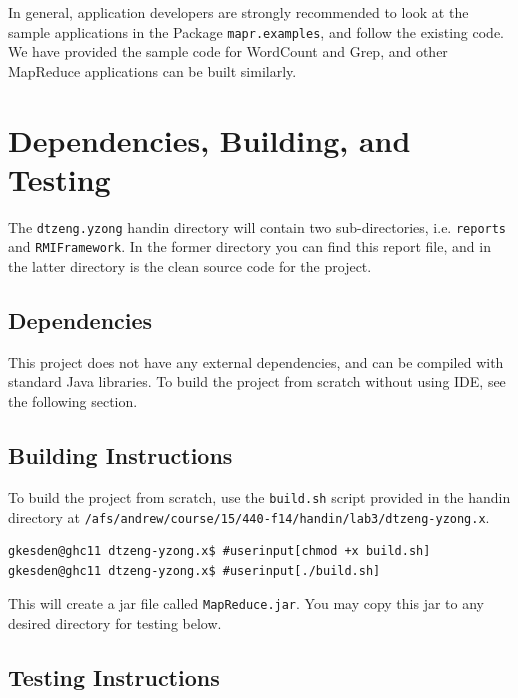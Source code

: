\documentclass{article} %
\begin{document}
\par\qquad In general, application developers are strongly recommended to look at the sample applications in the Package \texttt{mapr.examples}, and follow the existing code. We have provided the sample code for WordCount and Grep, and other MapReduce applications can be built similarly.

\section{Dependencies, Building, and Testing}

\par\qquad The \texttt{dtzeng.yzong} handin directory will contain two sub-directories, i.e. \texttt{reports} and \texttt{RMIFramework}. In the former directory you can find this report file, and in the latter directory is the clean source code for the project.

\subsection{Dependencies}

\par\qquad This project does not have any external dependencies, and can be compiled with standard Java libraries. To build the project from scratch without using IDE, see the following section.

\subsection{Building Instructions}

\par\qquad To build the project from scratch, use the \texttt{build.sh} script provided in the handin directory at \texttt{/afs/andrew/course/15/440-f14/handin/lab3/dtzeng-yzong.x}.

\begin{Verbatim}[commandchars=\#\[\]]
gkesden@ghc11 dtzeng-yzong.x$ #userinput[chmod +x build.sh]
gkesden@ghc11 dtzeng-yzong.x$ #userinput[./build.sh]
\end{Verbatim}

\par\qquad This will create a jar file called \texttt{MapReduce.jar}.  You may copy this jar to any desired directory for testing below.

\subsection{Testing Instructions}
\end{document}
